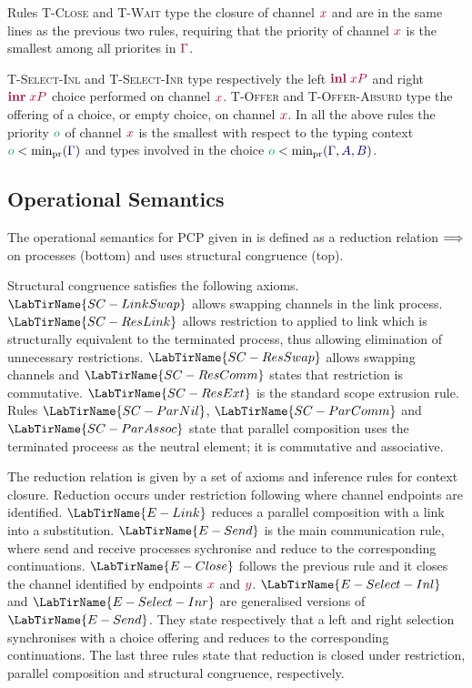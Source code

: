 \documentclass[main.tex]{subfiles}
\begin{document}
Rules \textsc{T-Close} and \textsc{T-Wait} type the closure of channel $\tm x$ and are in the same lines as the previous two rules, requiring that the priority of channel $\tm x$ is the smallest among all priorites in $\tm\Gamma$.

\textsc{T-Select-Inl} and \textsc{T-Select-Inr} type respectively the left $\tm{\inl{x}{P}}$ and right $\tm{\inr{x}{P}}$ choice performed on channel $\tm x$. \textsc{T-Offer} and \textsc{T-Offer-Absurd} type the offering of a choice, or empty choice, on channel $\tm x$. In all the above rules the priority $\cs o$ of channel $\tm x$ is the smallest with respect to the typing context $\cs{o}<\minpr(\ty{\Gamma})$ and types involved in the choice $\cs{o}<\minpr(\ty{\Gamma},\ty{A},\ty{B})$.
 
\subsection{Operational Semantics}


The operational semantics for PCP given in  is defined as a reduction relation $\Longrightarrow$ on processes (bottom) and uses structural congruence (top).

Structural congruence satisfies the following axioms. $\LabTirName{SC-LinkSwap}$ allows swapping channels in the link process. $\LabTirName{SC-ResLink}$ allows restriction to applied to link which is structurally equivalent to the terminated process, thus allowing elimination of unnecessary restrictions. $\LabTirName{SC-ResSwap}$ allows swapping channels and $\LabTirName{SC-ResComm}$ states that restriction is commutative. $\LabTirName{SC-ResExt}$ is the standard scope extrusion rule. Rules $\LabTirName{SC-ParNil}$, $\LabTirName{SC-ParComm}$ and $\LabTirName{SC-ParAssoc}$ state that parallel composition uses the terminated proceess as the neutral element; it is commutative and associative.

The reduction relation is given by a set of axioms and inference rules for context closure. Reduction occurs under restriction following \cite{dardha2018} where channel endpoints are identified.
$\LabTirName{E-Link}$ reduces a parallel composition with a link into a substitution. $\LabTirName{E-Send}$ is the main communication rule, where send and receive processes sychronise and reduce to the corresponding continuations. $\LabTirName{E-Close}$ follows the previous rule and it closes the channel identified by endpoints $\tm x$ and $\tm y$. $\LabTirName{E-Select-Inl}$ and $\LabTirName{E-Select-Inr}$ are generalised versions of $\LabTirName{E-Send}$. They state respectively that a left and right selection synchronises with a choice offering and reduces to the corresponding continuations. The last three rules state that reduction is closed under restriction, parallel composition and structural congruence, respectively. 
\end{document}
